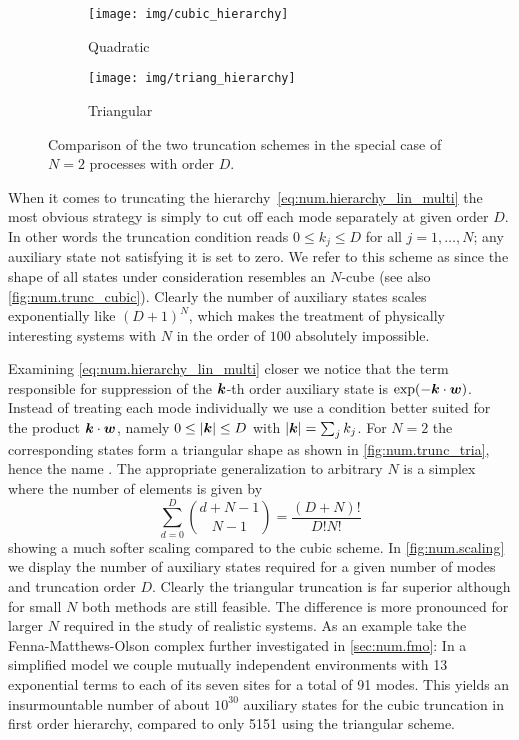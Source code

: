 \begin{figure}
  \centering
  \begin{subfigure}[b]{.4\columnwidth}
    \centering
    \texttt{[image: img/cubic\_hierarchy]}
    \caption{Quadratic}
    \label{fig:num.trunc_cubic}
  \end{subfigure}
  \begin{subfigure}[b]{.4\columnwidth}
    \centering
    \texttt{[image: img/triang\_hierarchy]}
    \caption{Triangular}
    \label{fig:num.trunc_tria}
  \end{subfigure}
  \caption{Comparison of the two truncation schemes in the special case of $N=2$ processes with order $D$.}
  \label{fig:num.trunc}
\end{figure}
When it comes to truncating the hierarchy~\ref{eq:num.hierarchy_lin_multi} the most obvious strategy is simply to cut off each mode separately at given order $D$.
In other words the truncation condition reads $0 \le k_j \le D$ for all $j=1,\dots,N$; any auxiliary state not satisfying it is set to zero.
We refer to this scheme as  since the shape of all states under consideration resembles an $N$-cube (see also \autoref{fig:num.trunc_cubic}).
Clearly the number of auxiliary states scales exponentially like $(D+1)^N$, which makes the treatment of physically interesting systems with $N$ in the order of $100$ absolutely impossible.

Examining \autoref{eq:num.hierarchy_lin_multi} closer we notice that the term responsible for suppression of the $\boldsymbol{k}$-th order auxiliary state is $\exp(-\kk \cdot \ww)$.
Instead of treating each mode individually we use a condition better suited for the product $\boldsymbol{k}\cdot\boldsymbol{w}$, namely $0 \le \left\vert \boldsymbol{k} \right\vert \le D$ with $\left\vert \boldsymbol{k} \right\vert = \sum_j k_j$.
For $N=2$ the corresponding states form a triangular shape as shown in \autoref{fig:num.trunc_tria}, hence the name .
The appropriate generalization to arbitrary $N$ is a simplex where the number of elements is given by
\begin{equation*}
  \sum_{d=0}^D {d + N - 1 \choose N - 1} = \frac{(D + N)!}{D!N!}
\end{equation*}
showing a much softer scaling compared to the cubic scheme.
In \autoref{fig:num.scaling} we display the number of auxiliary states required for a given number of modes and truncation order $D$.
Clearly the triangular truncation is far superior although for small $N$ both methods are still feasible.
The difference is more pronounced for larger $N$ required in the study of realistic systems.
As an example take the Fenna-Matthews-Olson complex further investigated in \autoref{sec:num.fmo}:
In a simplified model we couple mutually independent environments with 13 exponential terms to each of its seven sites for a total of 91 modes.
This yields an insurmountable number of about $10^{30}$ auxiliary states for the cubic truncation in first order hierarchy, compared to only 5151 using the triangular scheme.


